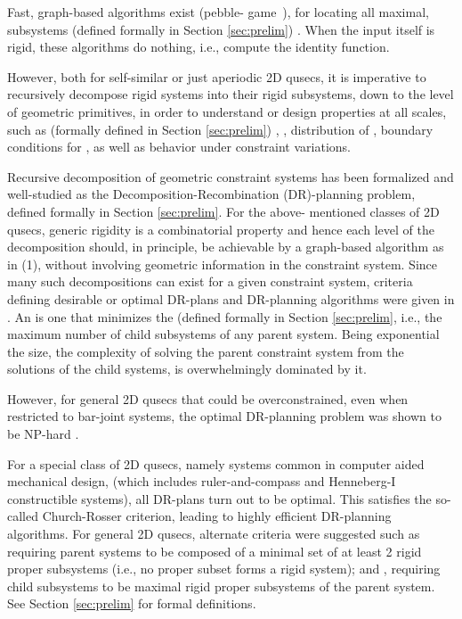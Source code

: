 \medskip\noindent
{}
Fast, graph-based algorithms exist (pebble-
game~\cite{Jacobs:1997:PG}), for locating all maximal,
 subsystems (defined formally in Section
\ref{sec:prelim}) \uncited. When the input itself is rigid, these
algorithms do nothing, i.e., compute the identity function.

However, both for self-similar or just aperiodic 2D qusecs, it is
imperative to recursively decompose rigid systems into their rigid
subsystems, down to the level of geometric primitives, in order to
understand or design properties at all scales, such as (formally
defined in Section \ref{sec:prelim}) , ,
distribution of , boundary conditions for
, as well as behavior under constraint variations.

\medskip\noindent
{}
Recursive decomposition of geometric constraint systems has been
formalized \uncited and well-studied \uncited as the \dfn
{Decomposition-Recombination (DR)-planning} problem, defined formally in
Section \ref{sec:prelim}. For the above-
mentioned classes of 2D qusecs, generic rigidity is a combinatorial
property and hence each level of the decomposition should, in
principle, be achievable by a graph-based algorithm as in (1), without
involving geometric information in the constraint system. Since many
such decompositions can exist for a given constraint system, criteria
defining desirable or optimal DR-plans and DR-planning algorithms were
given in \uncited. An  is one that minimizes
the  (defined formally in Section \ref{sec:prelim}, i.e.,
the maximum number of child subsystems of any parent system.
Being exponential the size, the complexity of solving the parent
constraint system from the solutions of the child systems, is overwhelmingly
dominated by it.

However, for general 2D qusecs that could be overconstrained, even
when restricted to bar-joint systems, the optimal DR-planning problem
was shown to be NP-hard \uncited.

\medskip\noindent
{}
For a special class of 2D qusecs, namely 
systems \uncited common in computer aided mechanical design, (which
includes ruler-and-compass and Henneberg-I constructible systems), all
DR-plans turn out to be optimal. This satisfies the so-called \dfn
{Church-Rosser} criterion, leading to highly efficient DR-planning
algorithms. For general 2D qusecs, alternate criteria were suggested
such as  requiring parent systems to be
composed of a minimal set of at least 2 rigid proper subsystems (i.e.,
no proper subset forms a rigid system); and ,
requiring child subsystems to be maximal rigid proper subsystems of
the parent system. See Section \ref{sec:prelim} for formal definitions.

